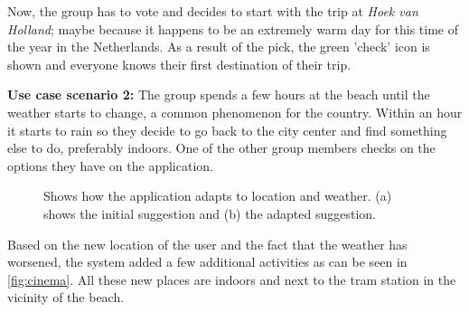 \documentclass[11pt,a4paper,oneside]{article}
\begin{document}
Now, the group has to vote and decides to start with the trip at \emph{Hoek van Holland}; maybe because it happens to be an extremely warm day for this time of the year in the Netherlands. As a result of the pick, the green 'check' icon is shown and everyone knows their first destination of their trip.

\textbf{Use case scenario 2:} The group spends a few hours at the beach until the weather starts to change, a common phenomenon for the country.  Within an hour it starts to rain so they decide to go back to the city center and find something else to do, preferably indoors. One of the other group members checks on the options they have on the application. 
\begin{figure}[H]
    \centering
    \qquad
    \caption{Shows how the application adapts to location and weather. (a) shows the initial suggestion and (b) the adapted suggestion.}
    \label{fig:cinema}
\end{figure}
Based on the new location of the user and the fact that the weather has worsened, the system added a few additional activities as can be seen in \autoref{fig:cinema}. All these new places are indoors and next to the tram station in the vicinity of the beach.
\end{document}

